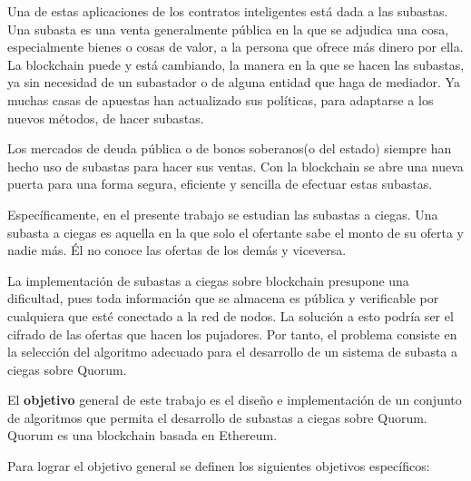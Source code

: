   Una de estas aplicaciones de los contratos inteligentes está dada a las subastas. Una subasta es una venta generalmente pública en la 
  que se adjudica una cosa, especialmente bienes o cosas de valor, a la persona que ofrece más dinero por ella. La blockchain puede y 
  está cambiando, la manera en la que se hacen las subastas, ya sin necesidad de un subastador o de alguna entidad que haga de mediador. 
  Ya muchas casas de apuestas han actualizado sus políticas, para adaptarse a los nuevos métodos, de hacer subastas. 

  Los mercados de deuda pública o de bonos soberanos(o del estado) siempre han hecho uso de subastas para hacer sus ventas. Con la
  blockchain se abre una nueva puerta para una forma segura, eficiente y sencilla de efectuar estas subastas. 

  Específicamente, en el presente trabajo se estudian las subastas a ciegas. Una subasta a ciegas es aquella en la que solo el ofertante 
  sabe el monto de su oferta y nadie más. Él no conoce las ofertas de los demás y viceversa.

  La implementación de subastas a ciegas sobre blockchain presupone una dificultad, pues toda información que se almacena es pública y 
  verificable por cualquiera que esté conectado a la red de nodos. La solución a esto podría ser el cifrado de las ofertas que hacen 
  los pujadores. Por tanto, el problema consiste en la selección del algoritmo adecuado para el desarrollo de un sistema de 
  subasta a ciegas sobre Quorum.

  El \textbf{objetivo} general de este trabajo es el diseño e implementación de un conjunto de algoritmos que permita el desarrollo de 
  subastas a ciegas sobre Quorum. Quorum es una blockchain basada en Ethereum.

  Para lograr el objetivo general se definen los siguientes objetivos específicos:

